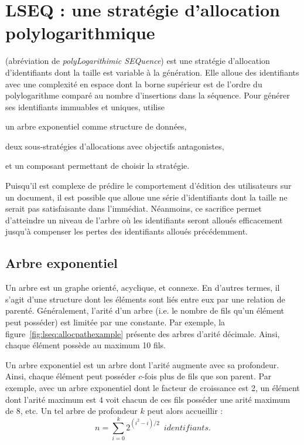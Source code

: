 
\section{LSEQ : une stratégie d'allocation polylogarithmique}
\label{lseq:sec:proposal}

\LSEQ (abréviation de \emph{polyLogarithimic SEQuence}) est une stratégie
d'allocation d'identifiants dont la taille est variable à la génération. Elle
alloue des identifiants avec une complexité en espace dont la borne supérieur
est de l'ordre du polylogarithme comparé au nombre d'insertions dans la
séquence.  Pour générer ses identifiants immuables et uniques, \LSEQ utilise
\begin{inparaenum}[(i)]
\item un arbre exponentiel comme structure de données,
\item deux sous-stratégies d'allocations avec objectifs antagonistes,
\item et un composant permettant de choisir la stratégie.
\end{inparaenum}

Puisqu'il est complexe de prédire le comportement d'édition des utilisateurs sur
un document, il est possible que \LSEQ alloue une série d'identifiants dont la
taille ne serait pas satisfaisante dans l'immédiat. Néanmoins, ce sacrifice
permet d'atteindre un niveau de l'arbre \LSEQ où les identifiants seront alloués 
efficacement jusqu'à compenser les pertes des identifiants alloués précédemment.

\subsection{Arbre exponentiel}

Un arbre est un graphe orienté, acyclique, et connexe. En d'autres termes, il
s'agit d'une structure dont les éléments sont liés entre eux par une relation de
parenté. Généralement, l'arité d'un arbre (i.e. le nombre de fils qu'un élément
peut posséder) est limitée par une constante. Par exemple, la
figure~\ref{fig:lseq:allocpathexample} présente des arbres d'arité
décimale. Ainsi, chaque élément possède au maximum 10 fils.

Un arbre exponentiel est un arbre dont l'arité augmente avec sa
profondeur. Ainsi, chaque élément peut posséder $c$-fois plus de fils que son
parent. Par exemple, avec un arbre exponentiel dont le facteur de croissance est
2, un élément dont l'arité maximum est $4$ voit chacun de ces fils posséder une
arité maximum de $8$, etc.  Un tel arbre de profondeur $k$ peut alors accueillir
:
\begin{equation}
  n = \sum\limits_{i=0}^{k} 2^{(i^2-i)/2}\,\,\, identifiants.
\end{equation}

